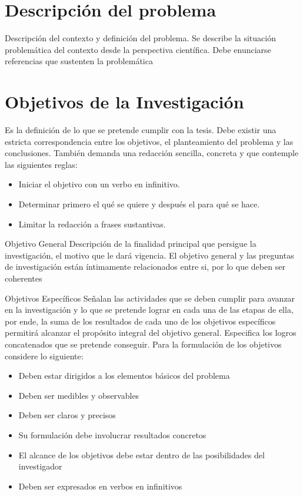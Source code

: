\documentclass[12]{informe_investigacion}
\begin{document}
\section{Descripción del problema}
Descripción del contexto y definición del problema. Se describe la situación problemática del contexto desde la perspectiva científica. Debe enunciarse referencias que sustenten la problemática

\section{Objetivos de la Investigación}
Es la definición de lo que se pretende cumplir con la tesis. Debe existir una estricta correspondencia entre los objetivos, el planteamiento del problema y las conclusiones. También demanda una redacción sencilla, concreta y que contemple las siguientes reglas:

\begin{itemize}
    \item Iniciar el objetivo con un verbo en infinitivo.
    \item Determinar primero el qué se quiere y después el para qué se hace.
    \item Limitar la redacción a frases sustantivas.
\end{itemize}

\begin{subseccion}{Objetivo General}
Descripción de la finalidad principal que persigue la investigación, el motivo que le dará vigencia. El objetivo general y las preguntas de investigación están íntimamente relacionados entre si, por lo que deben ser coherentes
\end{subseccion}

\begin{subseccion}{Objetivos Específicos}
Señalan las actividades que se deben cumplir para avanzar en la investigación y lo que se pretende lograr en cada una de las etapas de ella, por ende, la suma de los resultados de cada uno de los objetivos específicos permitirá alcanzar el propósito integral del objetivo general. Especifica los logros concatenados que se pretende conseguir.
Para la formulación de los objetivos considere lo siguiente:
\begin{itemize}
    \item Deben estar dirigidos a los elementos básicos del problema
    \item Deben ser medibles y observables
    \item Deben ser claros y precisos
    \item Su formulación debe involucrar resultados concretos
    \item El alcance de los objetivos debe estar dentro de las posibilidades del investigador
    \item Deben ser expresados en verbos en infinitivos
\end{itemize}
\end{subseccion}
\end{document}
